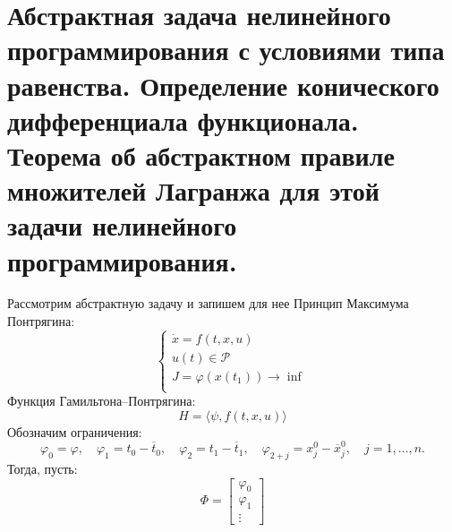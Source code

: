 \documentclass[oneside, final, 14pt, draft]{article}
\theoremstyle{definition}
\theoremstyle{definition}
\theoremstyle{remark}
\theoremstyle{theorem}
\renewcommand{\phi}{\varphi}
\begin{document}
\section{Абстрактная задача нелинейного программирования с условиями типа равенства. Определение конического дифференциала функционала. Теорема об абстрактном правиле множителей Лагранжа для этой задачи нелинейного программирования.}
Рассмотрим абстрактную задачу и запишем для нее Принцип Максимума Понтрягина:
\begin{equation}\label{ssystem}
\begin{cases}
\dot{x} = f(t, x, u)\\
u(t) \in \mathcal{P}\\
J = \phi(x(t_1)) \rightarrow \inf\\
\end{cases}
\end{equation}
Функция Гамильтона--Понтрягина:
$$H = \langle \psi,f(t, x, u)\rangle$$
Обозначим ограничения:
$$
 \phi_0 = \phi,\quad \phi_1 = t_0 - \overline{t}_0,\quad \phi_2 = t_1 - \overline{t}_1, \quad \phi_{2+j} = x_j^0 - \overline{x}_j^0, \quad j=1,\ldots, n.
$$
Тогда, пусть:
$$
\Phi = \begin{bmatrix}
			\phi_0\\
			\phi_1\\
			\vdots
   \end{bmatrix}
$$
\end{document}
